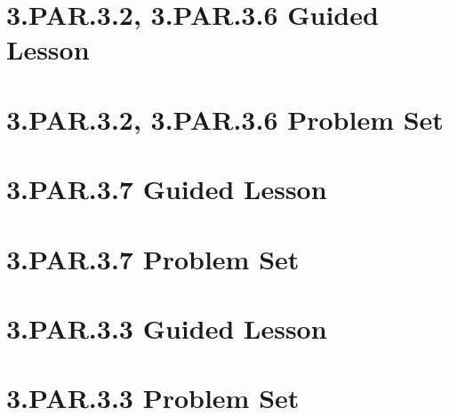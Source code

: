 \documentclass[a4paper,12pt]{article}
\title{}
\date{}
\begin{document}

\hypertarget{toc}{}  %
\tableofcontents


\newpage



\pagestyle{fancy}  %



\newpage
\section{3.PAR.3.2, 3.PAR.3.6 Guided Lesson}


\newpage
\section{3.PAR.3.2, 3.PAR.3.6 Problem Set}


\newpage
\section{3.PAR.3.7 Guided Lesson}


\newpage
\section{3.PAR.3.7 Problem Set}


\newpage
\section{3.PAR.3.3 Guided Lesson}


\newpage
\section{3.PAR.3.3 Problem Set}

\end{document}
